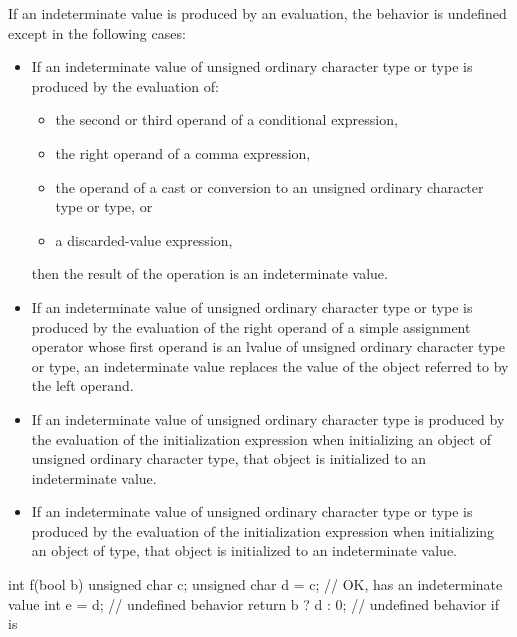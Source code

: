 \pnum
If an indeterminate value is produced by an evaluation,
the behavior is undefined except in the following cases:
\begin{itemize}
\item
  If an indeterminate value of
  unsigned ordinary character type
  or  type
  is produced by the evaluation of:
  \begin{itemize}
  \item
    the second or third operand of a conditional expression,
  \item
    the right operand of a comma expression,
  \item
    the operand of a cast or conversion
    to an unsigned ordinary character type
    or  type, or
  \item
    a discarded-value expression,
  \end{itemize}
  then the result of the operation is an indeterminate value.
\item
  If an indeterminate value of
  unsigned ordinary character type or  type
  is produced by the evaluation of
  the right operand of a simple assignment operator
  whose first operand is an lvalue of
  unsigned ordinary character type or  type,
  an indeterminate value replaces
  the value of the object referred to by the left operand.
\item
  If an indeterminate value of unsigned ordinary character type
  is produced by the evaluation of the initialization expression
  when initializing an object of unsigned ordinary character type,
  that object is initialized to an indeterminate
  value.
\item
  If an indeterminate value of
  unsigned ordinary character type or  type
  is produced by the evaluation of the initialization expression
  when initializing an object of  type,
  that object is initialized to an indeterminate value.
\end{itemize}
\begin{example}
\begin{codeblock}
int f(bool b) {
  unsigned char c;
  unsigned char d = c;          // OK,  has an indeterminate value
  int e = d;                    // undefined behavior
  return b ? d : 0;             // undefined behavior if  is 
}
\end{codeblock}
\end{example}

